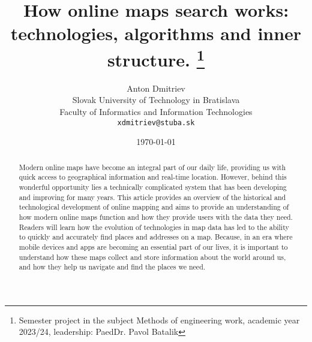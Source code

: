 \documentclass[10pt,oneside,english,a4paper]{article}
\title{How online maps search works: technologies, algorithms and inner structure.
\thanks{Semester project in the subject Methods of engineering work, academic year 2023/24, leadership: PaedDr. Pavol Batalik}}
\author{Anton Dmitriev\\[2pt]
	{\small Slovak University of Technology in Bratislava}\\
	{\small Faculty of Informatics and Information Technologies}\\
	{\small \texttt{xdmitriev@stuba.sk}}
	}
\date{\small \today}
\begin{document}
\maketitle

\begin{abstract}
	Modern online maps have become an integral part of our daily life, providing us with quick access to geographical information and real-time location. However, behind this wonderful opportunity lies a technically complicated system that has been developing and improving for many years. This article provides an overview of the historical and technological development of online mapping and aims to provide an understanding of how modern online maps function and how they provide users with the data they need. Readers will learn how the evolution of technologies in map data has led to the ability to quickly and accurately find places and addresses on a map. Because, in an era where mobile devices and apps are becoming an essential part of our lives, it is important to understand how these maps collect and store information about the world around us, and how they help us navigate and find the places we need.
\end{abstract}







\end{document}
